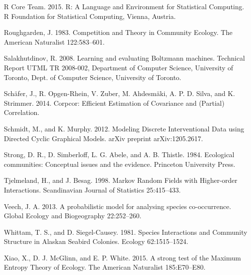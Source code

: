 \documentclass[12pt,]{article}
\begin{document}
\begin{spacing}{1.9}
\begin{flushleft}
R Core Team. 2015. R: A Language and Environment for Statistical
Computing. R Foundation for Statistical Computing, Vienna, Austria.

Roughgarden, J. 1983. Competition and Theory in Community Ecology. The
American Naturalist 122:583--601.

Salakhutdinov, R. 2008. Learning and evaluating Boltzmann machines.
Technical Report UTML TR 2008-002, Department of Computer Science,
University of Toronto, Dept. of Computer Science, University of Toronto.

Schäfer, J., R. Opgen-Rhein, V. Zuber, M. Ahdesmäki, A. P. D. Silva, and
K. Strimmer. 2014. Corpcor: Efficient Estimation of Covariance and
(Partial) Correlation.

Schmidt, M., and K. Murphy. 2012. Modeling Discrete Interventional Data
using Directed Cyclic Graphical Models. arXiv preprint arXiv:1205.2617.

Strong, D. R., D. Simberloff, L. G. Abele, and A. B. Thistle. 1984.
Ecological communities: Conceptual issues and the evidence. Princeton
University Press.

Tjelmeland, H., and J. Besag. 1998. Markov Random Fields with
Higher-order Interactions. Scandinavian Journal of Statistics
25:415--433.

Veech, J. A. 2013. A probabilistic model for analysing species
co-occurrence. Global Ecology and Biogeography 22:252--260.

Whittam, T. S., and D. Siegel-Causey. 1981. Species Interactions and
Community Structure in Alaskan Seabird Colonies. Ecology 62:1515--1524.

Xiao, X., D. J. McGlinn, and E. P. White. 2015. A strong test of the
Maximum Entropy Theory of Ecology. The American Naturalist 185:E70--E80.
\end{flushleft}
\end{spacing}
\end{document}
